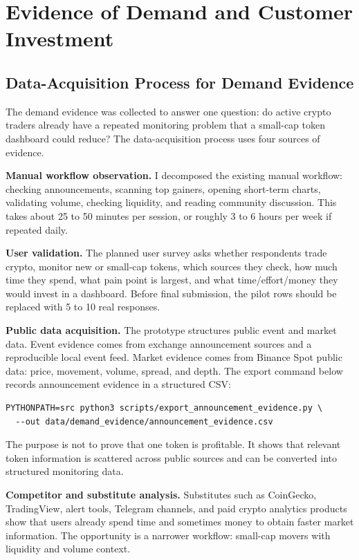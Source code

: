 \documentclass[11pt]{article}
\begin{document}
\section{Evidence of Demand and Customer Investment}

\subsection{Data-Acquisition Process for Demand Evidence}

The demand evidence was collected to answer one question: do active crypto traders already have a repeated monitoring problem that a small-cap token dashboard could reduce? The data-acquisition process uses four sources of evidence.

\textbf{Manual workflow observation.}
I decomposed the existing manual workflow: checking announcements, scanning top gainers, opening short-term charts, validating volume, checking liquidity, and reading community discussion. This takes about 25 to 50 minutes per session, or roughly 3 to 6 hours per week if repeated daily.

\textbf{User validation.}
The planned user survey asks whether respondents trade crypto, monitor new or small-cap tokens, which sources they check, how much time they spend, what pain point is largest, and what time/effort/money they would invest in a dashboard. Before final submission, the pilot rows should be replaced with 5 to 10 real responses.

\textbf{Public data acquisition.}
The prototype structures public event and market data. Event evidence comes from exchange announcement sources and a reproducible local event feed. Market evidence comes from Binance Spot public data: price, movement, volume, spread, and depth. The export command below records announcement evidence in a structured CSV:
\begin{verbatim}
PYTHONPATH=src python3 scripts/export_announcement_evidence.py \
  --out data/demand_evidence/announcement_evidence.csv
\end{verbatim}
The purpose is not to prove that one token is profitable. It shows that relevant token information is scattered across public sources and can be converted into structured monitoring data.

\textbf{Competitor and substitute analysis.}
Substitutes such as CoinGecko, TradingView, alert tools, Telegram channels, and paid crypto analytics products show that users already spend time and sometimes money to obtain faster market information. The opportunity is a narrower workflow: small-cap movers with liquidity and volume context.
\end{document}
